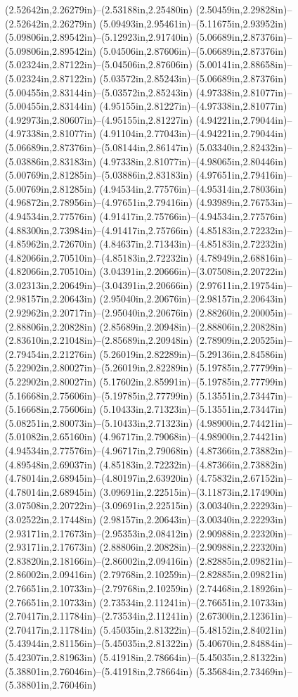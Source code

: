 (2.52642in,2.26279in)--(2.53188in,2.25480in) (2.50459in,2.29828in)--(2.52642in,2.26279in) (5.09493in,2.95461in)--(5.11675in,2.93952in) (5.09806in,2.89542in)--(5.12923in,2.91740in) (5.06689in,2.87376in)--(5.09806in,2.89542in) (5.04506in,2.87606in)--(5.06689in,2.87376in) (5.02324in,2.87122in)--(5.04506in,2.87606in) (5.00141in,2.88658in)--(5.02324in,2.87122in) (5.03572in,2.85243in)--(5.06689in,2.87376in) (5.00455in,2.83144in)--(5.03572in,2.85243in) (4.97338in,2.81077in)--(5.00455in,2.83144in) (4.95155in,2.81227in)--(4.97338in,2.81077in) (4.92973in,2.80607in)--(4.95155in,2.81227in) (4.94221in,2.79044in)--(4.97338in,2.81077in) (4.91104in,2.77043in)--(4.94221in,2.79044in) (5.06689in,2.87376in)--(5.08144in,2.86147in) (5.03340in,2.82432in)--(5.03886in,2.83183in) (4.97338in,2.81077in)--(4.98065in,2.80446in) (5.00769in,2.81285in)--(5.03886in,2.83183in) (4.97651in,2.79416in)--(5.00769in,2.81285in) (4.94534in,2.77576in)--(4.95314in,2.78036in) (4.96872in,2.78956in)--(4.97651in,2.79416in) (4.93989in,2.76753in)--(4.94534in,2.77576in) (4.91417in,2.75766in)--(4.94534in,2.77576in) (4.88300in,2.73984in)--(4.91417in,2.75766in) (4.85183in,2.72232in)--(4.85962in,2.72670in) (4.84637in,2.71343in)--(4.85183in,2.72232in) (4.82066in,2.70510in)--(4.85183in,2.72232in) (4.78949in,2.68816in)--(4.82066in,2.70510in) (3.04391in,2.20666in)--(3.07508in,2.20722in) (3.02313in,2.20649in)--(3.04391in,2.20666in) (2.97611in,2.19754in)--(2.98157in,2.20643in) (2.95040in,2.20676in)--(2.98157in,2.20643in) (2.92962in,2.20717in)--(2.95040in,2.20676in) (2.88260in,2.20005in)--(2.88806in,2.20828in) (2.85689in,2.20948in)--(2.88806in,2.20828in) (2.83610in,2.21048in)--(2.85689in,2.20948in) (2.78909in,2.20525in)--(2.79454in,2.21276in) (5.26019in,2.82289in)--(5.29136in,2.84586in) (5.22902in,2.80027in)--(5.26019in,2.82289in) (5.19785in,2.77799in)--(5.22902in,2.80027in) (5.17602in,2.85991in)--(5.19785in,2.77799in) (5.16668in,2.75606in)--(5.19785in,2.77799in) (5.13551in,2.73447in)--(5.16668in,2.75606in) (5.10433in,2.71323in)--(5.13551in,2.73447in) (5.08251in,2.80073in)--(5.10433in,2.71323in) (4.98900in,2.74421in)--(5.01082in,2.65160in) (4.96717in,2.79068in)--(4.98900in,2.74421in) (4.94534in,2.77576in)--(4.96717in,2.79068in) (4.87366in,2.73882in)--(4.89548in,2.69037in) (4.85183in,2.72232in)--(4.87366in,2.73882in) (4.78014in,2.68945in)--(4.80197in,2.63920in) (4.75832in,2.67152in)--(4.78014in,2.68945in) (3.09691in,2.22515in)--(3.11873in,2.17490in) (3.07508in,2.20722in)--(3.09691in,2.22515in) (3.00340in,2.22293in)--(3.02522in,2.17448in) (2.98157in,2.20643in)--(3.00340in,2.22293in) (2.93171in,2.17673in)--(2.95353in,2.08412in) (2.90988in,2.22320in)--(2.93171in,2.17673in) (2.88806in,2.20828in)--(2.90988in,2.22320in) (2.83820in,2.18166in)--(2.86002in,2.09416in) (2.82885in,2.09821in)--(2.86002in,2.09416in) (2.79768in,2.10259in)--(2.82885in,2.09821in) (2.76651in,2.10733in)--(2.79768in,2.10259in) (2.74468in,2.18926in)--(2.76651in,2.10733in) (2.73534in,2.11241in)--(2.76651in,2.10733in) (2.70417in,2.11784in)--(2.73534in,2.11241in) (2.67300in,2.12361in)--(2.70417in,2.11784in) (5.45035in,2.81322in)--(5.48152in,2.84021in) (5.43944in,2.81156in)--(5.45035in,2.81322in) (5.40670in,2.84884in)--(5.42307in,2.81963in) (5.41918in,2.78664in)--(5.45035in,2.81322in) (5.38801in,2.76046in)--(5.41918in,2.78664in) (5.35684in,2.73469in)--(5.38801in,2.76046in) 